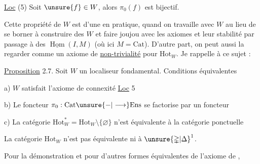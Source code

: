
\uline{Loc} (5)  Soit $\unsure{f}\in W$, alors $\pi_0(f)$ est bijectif.

Cette  propriété de $W$ est d'une   en pratique, quand on travaille avec $W$ au lieu de se borner à construire des $W$ et faire joujou avec les axiomes et leur stabilité par passage à des $\underline{\operatorname{Hom}}(I,M)$ (où ici $M=\mathrm{Cat}$). D'autre part, on peut aussi la regarder comme un axiome de \uline{non-trivialité} pour $\mathrm{Hot}_W$. Je rappelle à ce sujet : 

\uline{Proposition} 2.7. Soit $W$ un localiseur fondamental. Conditions équivalentes

a) $W$ satisfait l'axiome de connexité \uline{Loc} 5

b) Le foncteur $\pi_0:\mathrm{Cat}\unsure{{-}|\longrightarrow}\mathrm{Ens}$ se factorise par un foncteur



c) La catégorie $\mathrm{Hot}_W^{*}=\mathrm{Hot}_W\setminus\{\varnothing\}$ n'est équivalente à la catégorie ponctuelle

La catégorie $\mathrm{Hot}_W$ n'est pas équivalente  ni à $\unsure{\mathbb{\Delta}|\Delta}^{1}$.

Pour la démonstration et pour d'autres formes équivalentes de l'axiome de ,

